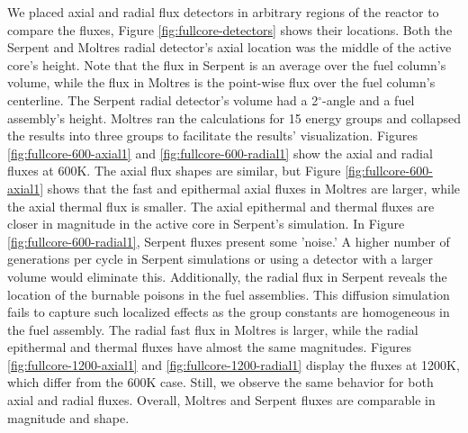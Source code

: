We placed axial and radial flux detectors in arbitrary regions of the reactor to compare the fluxes, Figure \ref{fig:fullcore-detectors} shows their locations.
Both the Serpent and Moltres radial detector's axial location was the middle of the active core's height.
Note that the flux in Serpent is an average over the fuel column's volume, while the flux in Moltres is the point-wise flux over the fuel column's centerline.
The Serpent radial detector's volume had a 2$^{\circ}$-angle and a fuel assembly's height.
Moltres ran the calculations for 15 energy groups and collapsed the results into three groups to facilitate the results' visualization.
Figures \ref{fig:fullcore-600-axial1} and \ref{fig:fullcore-600-radial1} show the axial and radial fluxes at 600K.
The axial flux shapes are similar, but Figure \ref{fig:fullcore-600-axial1} shows that the fast and epithermal axial fluxes in Moltres are larger, while the axial thermal flux is smaller.
The axial epithermal and thermal fluxes are closer in magnitude in the active core in Serpent's simulation.
In Figure \ref{fig:fullcore-600-radial1}, Serpent fluxes present some 'noise.'
A higher number of generations per cycle in Serpent simulations or using a detector with a larger volume would eliminate this.
Additionally, the radial flux in Serpent reveals the location of the burnable poisons in the fuel assemblies.
This diffusion simulation fails to capture such localized effects as the group constants are homogeneous in the fuel assembly.
The radial fast flux in Moltres is larger, while the radial epithermal and thermal fluxes have almost the same magnitudes.
Figures \ref{fig:fullcore-1200-axial1} and \ref{fig:fullcore-1200-radial1} display the fluxes at 1200K, which differ from the 600K case.
Still, we observe the same behavior for both axial and radial fluxes.
Overall, Moltres and Serpent fluxes are comparable in magnitude and shape.

